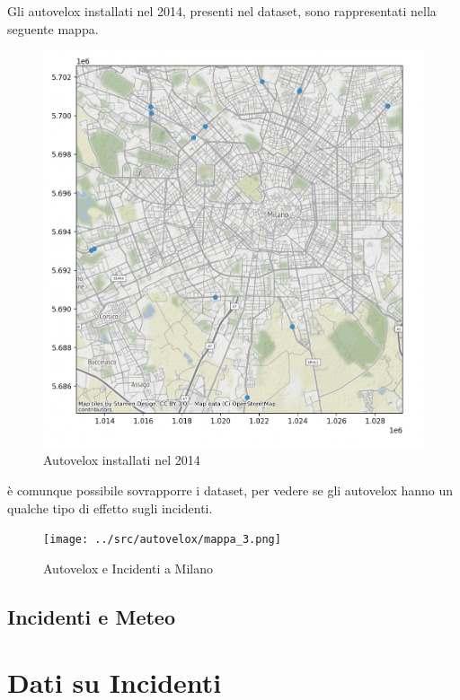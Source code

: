 \documentclass[a4paper]{report}
\begin{document}
Gli autovelox installati nel 2014, presenti nel dataset, sono rappresentati nella seguente mappa.
\begin{figure}
    \includegraphics[width=\linewidth]{../src/autovelox/autovelox_2014.png}
    \caption{Autovelox installati nel 2014}
    \label{fig:autovelox_2014}
\end{figure}


è comunque possibile sovrapporre i dataset, per vedere se gli autovelox hanno un qualche tipo di 
effetto sugli incidenti.

\begin{figure}
    \texttt{[image: ../src/autovelox/mappa\_3.png]}
    \caption{Autovelox e Incidenti a Milano}
    \label{fig:autovelox}
\end{figure}




\section{Incidenti e Meteo}

\chapter{Dati su Incidenti}
\end{document}
